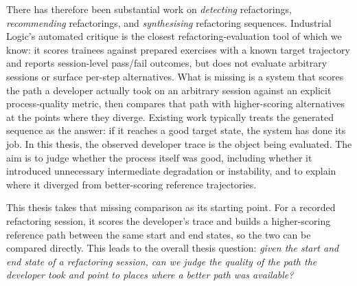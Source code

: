 There has therefore been substantial work on \emph{detecting} refactorings, \emph{recommending} refactorings, and \emph{synthesising} refactoring sequences. Industrial Logic's automated critique \cite{industriallogic_critique} is the closest refactoring-evaluation tool of which we know: it scores trainees against prepared exercises with a known target trajectory and reports session-level pass/fail outcomes, but does not evaluate arbitrary sessions or surface per-step alternatives. What is missing is a system that scores the path a developer actually took on an arbitrary session against an explicit process-quality metric, then compares that path with higher-scoring alternatives at the points where they diverge. Existing work typically treats the generated sequence as the answer: if it reaches a good target state, the system has done its job. In this thesis, the observed developer trace is the object being evaluated. The aim is to judge whether the process itself was good, including whether it introduced unnecessary intermediate degradation or instability, and to explain where it diverged from better-scoring reference trajectories.

This thesis takes that missing comparison as its starting point. For a recorded refactoring session, it scores the developer's trace and builds a higher-scoring reference path between the same start and end states, so the two can be compared directly. This leads to the overall thesis question: \emph{given the start and end state of a refactoring session, can we judge the quality of the path the developer took and point to places where a better path was available?}
